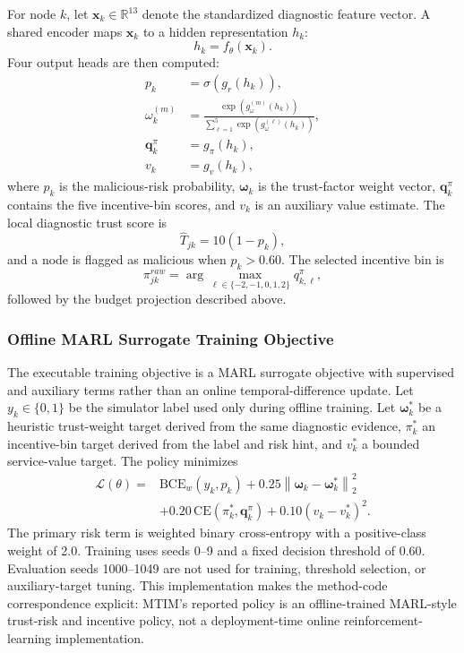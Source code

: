 \documentclass[notspecified,article,submit,moreauthors]{Definitions/mdpi}
\begin{document}
For node $k$, let $\mathbf{x}_k \in \mathbb{R}^{13}$ denote the standardized diagnostic feature vector. A shared encoder maps $\mathbf{x}_k$ to a hidden representation $h_k$:
\begin{equation}
h_k = f_{\theta}(\mathbf{x}_k).
\end{equation}
Four output heads are then computed:
\begin{equation}
\begin{aligned}
p_k &= \sigma(g_r(h_k)),\\
\omega_k^{(m)} &= \frac{\exp(g_{\omega}^{(m)}(h_k))}{\sum_{\ell=1}^{5}\exp(g_{\omega}^{(\ell)}(h_k))},\\
\mathbf{q}_k^{\pi} &= g_{\pi}(h_k),\\
v_k &= g_v(h_k),
\end{aligned}
\label{eq:policy_heads}
\end{equation}
where $p_k$ is the malicious-risk probability, $\boldsymbol{\omega}_k$ is the trust-factor weight vector, $\mathbf{q}_k^{\pi}$ contains the five incentive-bin scores, and $v_k$ is an auxiliary value estimate. The local diagnostic trust score is
\begin{equation}
\hat{T}_{jk}=10(1-p_k),
\end{equation}
and a node is flagged as malicious when $p_k > 0.60$. The selected incentive bin is
\begin{equation}
\pi_{jk}^{raw} = \arg\max_{\ell \in \{-2,-1,0,1,2\}} q_{k,\ell}^{\pi},
\end{equation}
followed by the budget projection described above.

\subsubsection{Offline MARL Surrogate Training Objective}
\label{sec:reward}
The executable training objective is a MARL surrogate objective with supervised and auxiliary terms rather than an online temporal-difference update. Let $y_k \in \{0,1\}$ be the simulator label used only during offline training. Let $\boldsymbol{\omega}_k^{*}$ be a heuristic trust-weight target derived from the same diagnostic evidence, $\pi_k^{*}$ an incentive-bin target derived from the label and risk hint, and $v_k^{*}$ a bounded service-value target. The policy minimizes
\begin{equation}
\begin{aligned}
\mathcal{L}(\theta) ={}& \mathrm{BCE}_{w}(y_k,p_k)
 + 0.25 \left\|\boldsymbol{\omega}_k-\boldsymbol{\omega}_k^{*}\right\|_2^2\\
&+ 0.20\,\mathrm{CE}(\pi_k^{*},\mathbf{q}_k^{\pi})
 + 0.10 \left(v_k-v_k^{*}\right)^2 .
\end{aligned}
\label{eq:implemented_loss}
\end{equation}
The primary risk term is weighted binary cross-entropy with a positive-class weight of 2.0. Training uses seeds 0--9 and a fixed decision threshold of 0.60. Evaluation seeds 1000--1049 are not used for training, threshold selection, or auxiliary-target tuning. This implementation makes the method-code correspondence explicit: MTIM's reported policy is an offline-trained MARL-style trust-risk and incentive policy, not a deployment-time online reinforcement-learning implementation.
\end{document}
